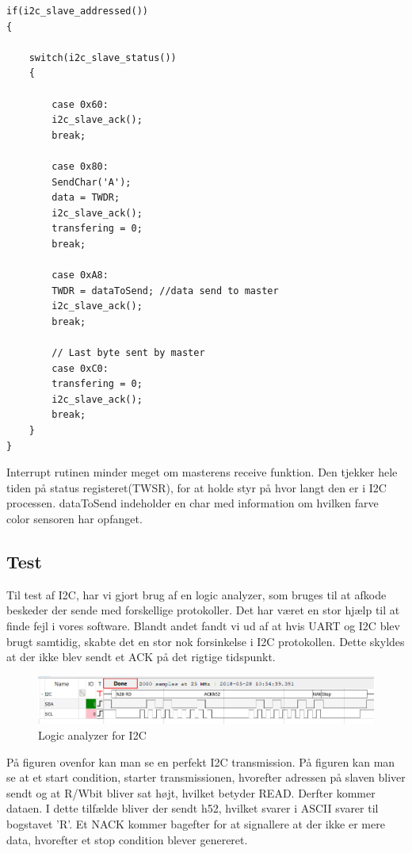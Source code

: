 \begin{lstlisting}
if(i2c_slave_addressed())
{
	
	switch(i2c_slave_status())
	{
		
		case 0x60:
		i2c_slave_ack();
		break;
		
		case 0x80:
		SendChar('A');
		data = TWDR;
		i2c_slave_ack();
		transfering = 0;
		break;
		
		case 0xA8:
		TWDR = dataToSend; //data send to master
		i2c_slave_ack();
		break;
		
		// Last byte sent by master
		case 0xC0:
		transfering = 0;
		i2c_slave_ack();
		break;
	}
}
\end{lstlisting}

Interrupt rutinen minder meget om masterens receive funktion. Den tjekker hele tiden på status registeret(TWSR), for at holde styr på hvor langt den er i I2C processen. dataToSend indeholder en char med information om hvilken farve color sensoren har opfanget. 



\subsection{Test}

Til test af I2C, har vi gjort brug af en logic analyzer, som bruges til at afkode beskeder der sende med forskellige protokoller. Det har været en stor hjælp til at finde fejl i vores software. Blandt andet fandt vi ud af at hvis UART og I2C blev brugt samtidig, skabte det en stor nok forsinkelse i I2C protokollen. Dette skyldes at der ikke blev sendt et ACK på det rigtige tidspunkt. 

\begin{figure}[H]
	\centering
	\includegraphics[width = 450pt]{Img/I2C_logic.png}
	\caption{Logic analyzer for I2C}
	\label{fig:I2C_Logic}
\end{figure}

På figuren ovenfor kan man se en perfekt I2C transmission. På figuren kan man se at et start condition, starter transmissionen, hvorefter adressen på slaven bliver sendt og at R/Wbit bliver sat højt, hvilket betyder READ. Derfter kommer dataen. I dette tilfælde bliver der sendt h52, hvilket svarer i ASCII svarer til bogstavet 'R'. Et NACK kommer bagefter for at signallere at der ikke er mere data, hvorefter et stop condition blever genereret.


